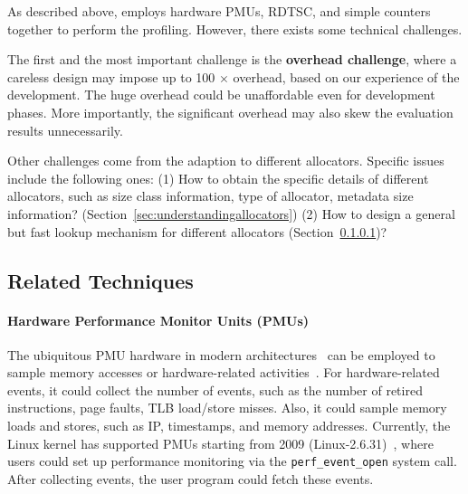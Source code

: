 As described above, \MP{} employs hardware PMUs, RDTSC, and simple counters together to perform the profiling. However, there exists some technical challenges. 

The first and the most important challenge is the \textbf{overhead challenge}, where a careless design may impose up to 100 $\times$ overhead, based on our experience of the development. The huge overhead could be unaffordable even for development phases. More importantly, the significant overhead may also skew the evaluation results unnecessarily. 

Other challenges come from the adaption to different allocators. Specific issues include the following ones: (1) How to obtain the specific details of different allocators, such as size class information, type of allocator, metadata size information? (Section~\ref{sec:understandingallocators}) (2) How to design a general but fast lookup mechanism for different allocators (Section~\ref{})? %


\subsection{Related Techniques}
\label{sec:pmu}

\paragraph{Hardware Performance Monitor Units (PMUs)} The ubiquitous PMU hardware in modern architectures~\cite{AMDIBS:07, IntelArch:PEBS:Sept09, armpmu} can be employed to sample memory accesses or hardware-related activities~\cite{DBLP:conf/sc/ItzkowitzWAK03, ibs-sc, ibs-pact, Sheng:2011:RLN:1985793.1985848, LASER, Cheetah}. For hardware-related events, it could collect the number of events, such as the number of retired instructions, page faults, TLB load/store misses. Also, it could sample  memory loads and stores, such as IP, timestamps, and memory addresses. Currently, the Linux kernel has supported PMUs starting from 2009 (Linux-2.6.31)~\cite{pmulinuxsupport}, where users could set up performance monitoring via  the \texttt{perf\_event\_open} system call. After collecting events, the user program could fetch these events. 

